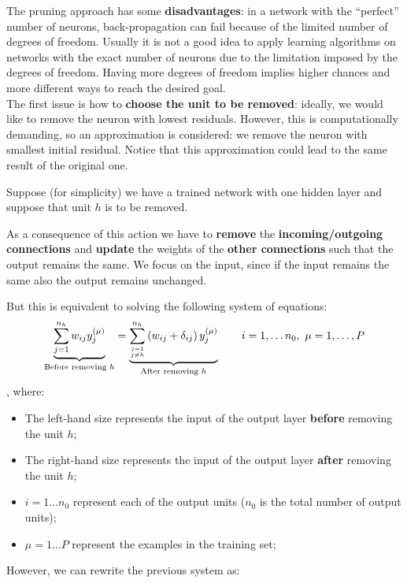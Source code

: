 The pruning approach has some \textbf{disadvantages}: in a network with the ``perfect'' number of neurons, back-propagation can fail because of the limited number of degrees of freedom. Usually it is not a good idea to apply learning algorithms on networks with the exact number of neurons due to the limitation imposed by the degrees of freedom. Having more degrees of freedom implies higher chances and more different ways to reach the desired goal.\\

The first issue is how to \textbf{choose the unit to be removed}: ideally, we would like to remove the neuron with lowest residuals. However, this is computationally demanding, so an approximation is considered: we remove the neuron with smallest initial residual. Notice that this approximation could lead to the same result of the original one.

Suppose (for simplicity) we have a trained network with one hidden layer and suppose that unit $h$ is to be removed. 


As a consequence of this action we have to \textbf{remove} the \textbf{incoming/outgoing connections} and \textbf{update} the weights of the \textbf{other connections} such that the output remains the same. We focus on the input, since if the input remains the same also the output remains unchanged.

But this is equivalent to solving the following system of equations:
$$\underbrace{\sum_{j=1}^{n_{h}} w_{ij} y_{j}^{(\mu)}}_{\text{Before removing }h} = \underbrace{\sum_{j=1 \atop j\neq h}^{n_{h}} \left( w_{ij} + \delta_{ij} \right) y_{j}^{ (\mu)}}_{\text{After removing }h} \qquad i=1, \dots n_0, ~ \mu=1,\dots, P$$ 
, where:

\begin{itemize}
    \item The left-hand size represents the input of the output layer \textbf{before} removing the unit $h$;
    \item The right-hand size represents the input of the output layer \textbf{after} removing the unit $h$;
    \item $i=1 \dots n_0$ represent each of the output units ($n_0$ is the total number of output units);
    \item $\mu=1 \dots P$ represent the examples in the training set;
\end{itemize}

However, we can rewrite the previous system as:

